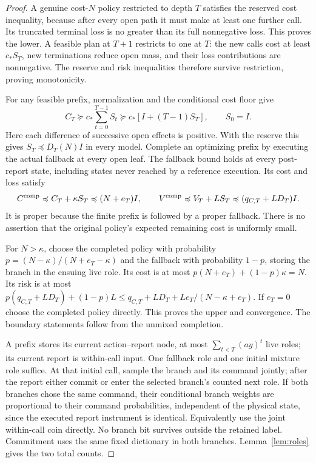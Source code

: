 \begin{proof}
A genuine cost-$N$ policy restricted to depth $T$ satisfies the reserved cost inequality, because after every open path it must make at least one further call. Its truncated terminal loss is no greater than its full nonnegative loss. This proves the lower. A feasible plan at $T+1$ restricts to one at $T$: the new calls cost at least $c_*S_T$, new terminations reduce open mass, and their loss contributions are nonnegative. The reserve and risk inequalities therefore survive restriction, proving monotonicity.

For any feasible prefix, normalization and the conditional cost floor give
\[
 C_T\succeq c_*\sum_{t=0}^{T-1}S_t
       \succeq c_*[I+(T-1)S_T],\qquad S_0=I.
\]
Here each difference of successive open effects is positive. With the reserve this gives $S_T\preccurlyeq D_T(N)I$ in every model. Complete an optimizing prefix by executing the actual fallback at every open leaf. The fallback bound holds at every post-report state, including states never reached by a reference execution. Its cost and loss satisfy
\[
 C^{\rm comp}\preccurlyeq C_T+\kappa S_T
       \preccurlyeq(N+e_T)I,\qquad
 V^{\rm comp}\preccurlyeq V_T+LS_T
       \preccurlyeq(q_{C,T}+LD_T)I.
\]
It is proper because the finite prefix is followed by a proper fallback. There is no assertion that the original policy's expected remaining cost is uniformly small.

For $N>\kappa$, choose the completed policy with probability
$p=(N-\kappa)/(N+e_T-\kappa)$ and the fallback with probability $1-p$, storing the branch in the ensuing live role. Its cost is at most $p(N+e_T)+(1-p)\kappa=N$. Its risk is at most
$p(q_{C,T}+LD_T)+(1-p)L\le q_{C,T}+LD_T+Le_T/(N-\kappa+e_T)$.
If $e_T=0$ choose the completed policy directly. This proves the upper and convergence. The boundary statements follow from the unmixed completion.

A prefix stores its current action--report node, at most $\sum_{t<T}(ay)^t$ live roles; its current report is within-call input. One fallback role and one initial mixture role suffice. At that initial call, sample the branch and its command jointly; after the report either commit or enter the selected branch's counted next role. If both branches chose the same command, their conditional branch weights are proportional to their command probabilities, independent of the physical state, since the executed report instrument is identical. Equivalently use the joint within-call coin directly. No branch bit survives outside the retained label. Commitment uses the same fixed dictionary in both branches. Lemma~\ref{lem:roles} gives the two total counts.
\end{proof}

